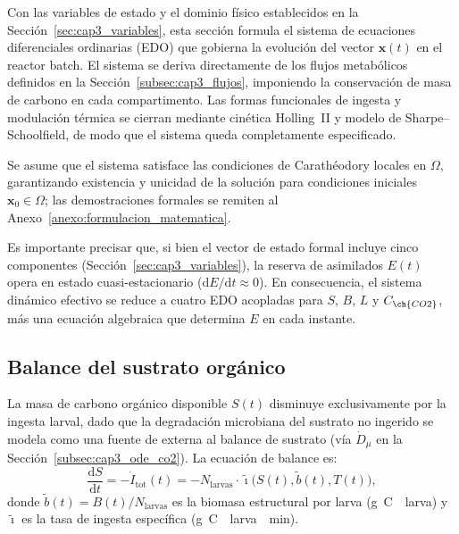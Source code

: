 
Con las variables de estado y el dominio físico establecidos en la Sección~\ref{sec:cap3_variables}, esta sección formula el sistema de ecuaciones diferenciales ordinarias (EDO) que gobierna la evolución del vector $\mathbf{x}(t)$ en el reactor batch. El sistema se deriva directamente de los flujos metabólicos definidos en la Sección~\ref{subsec:cap3_flujos}, imponiendo la conservación de masa de carbono en cada compartimento. Las formas funcionales de ingesta y modulación térmica se cierran mediante cinética Holling~II y modelo de Sharpe--Schoolfield, de modo que el sistema queda completamente especificado.

Se asume que el sistema satisface las condiciones de Carathéodory locales en $\Omega$, garantizando existencia y unicidad de la solución para condiciones iniciales $\mathbf{x}_0 \in \Omega$; las demostraciones formales se remiten al Anexo~\ref{anexo:formulacion_matematica}.

Es importante precisar que, si bien el vector de estado formal incluye cinco componentes (Sección~\ref{sec:cap3_variables}), la reserva de asimilados $E(t)$ opera en estado cuasi-estacionario ($\mathrm{d}E/\mathrm{d}t \approx 0$). En consecuencia, el sistema dinámico efectivo se reduce a cuatro EDO acopladas para $S$, $B$, $L$ y $C_{\ch{CO2}}$, más una ecuación algebraica que determina $E$ en cada instante.

\subsection{Balance del sustrato orgánico}
\label{subsec:cap3_ode_sustrato}

La masa de carbono orgánico disponible $S(t)$ disminuye exclusivamente por la ingesta larval, dado que la degradación microbiana del sustrato no ingerido se modela como una fuente de  externa al balance de sustrato (vía $\dot{D}_{\mu}$ en la Sección~\ref{subsec:cap3_ode_co2}). La ecuación de balance es:
\begin{equation}
    \frac{\mathrm{d}S}{\mathrm{d}t} = -\dot{I}_{\mathrm{tot}}(t) = -N_{\mathrm{larvas}} \cdot \tilde{\imath}\bigl(S(t), \tilde{b}(t), T(t)\bigr),
    \label{eq:cap3_ode_sustrato}
\end{equation}
donde $\tilde{b}(t) = B(t)/N_{\mathrm{larvas}}$ es la biomasa estructural por larva (\si{\gram C \per larva}) y $\tilde{\imath}$ es la tasa de ingesta específica (\si{\gram C \per larva \per \minute}).

